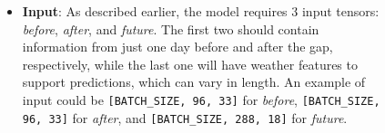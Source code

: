 \begin{figure}[H]
	\begin{minipage}{0.6\textwidth}
		\begin{itemize}
			\item \textbf{Input}: As described earlier, the model requires 3 input tensors: \textit{before}, \textit{after}, and \textit{future}. The first two should contain information from just one day before and after the gap, respectively, while the last one will have weather features to support predictions, which can vary in length. An example of input could be \verb|[BATCH_SIZE, 96, 33]| for \textit{before}, \verb|[BATCH_SIZE, 96, 33]| for \textit{after}, and \verb|[BATCH_SIZE, 288, 18]| for \textit{future}.


\end{itemize}
\end{minipage}
\end{figure}
